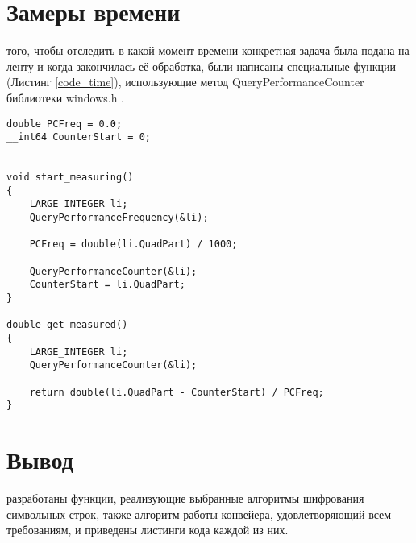 \section{Замеры времени}
 того, чтобы отследить в какой момент времени конкретная задача была подана на ленту и когда закончилась её обработка, были написаны специальные функции (Листинг \ref{code_time}), использующие метод QueryPerformanceCounter библиотеки windows.h \cite{Query}.

\begin{lstlisting}[label=code_time, caption = Работа со временем]
double PCFreq = 0.0;
__int64 CounterStart = 0;


void start_measuring()
{
	LARGE_INTEGER li;
	QueryPerformanceFrequency(&li);
	
	PCFreq = double(li.QuadPart) / 1000;
	
	QueryPerformanceCounter(&li);
	CounterStart = li.QuadPart;
}

double get_measured()
{
	LARGE_INTEGER li;
	QueryPerformanceCounter(&li);
	
	return double(li.QuadPart - CounterStart) / PCFreq;
}
\end{lstlisting}

\section*{Вывод}
 разработаны функции, реализующие выбранные алгоритмы шифрования символьных строк, также алгоритм работы конвейера, удовлетворяющий всем требованиям, и приведены листинги кода каждой из них.

